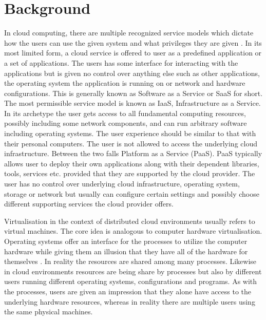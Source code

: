 \section{Background}

			In cloud computing, there are multiple recognized service models which dictate how the users can use the given system and what privileges they are given \cite{Mell:2011:SND:2206223}. In its most limited form, a cloud service is offered to user as a predefined application or a set of applications. The users has some interface for interacting with the applications but is given no control over anything else such as other applications, the operating system the application is running on or network and hardware configurations. This is generally known as Software as a Service or SaaS for short. The most permissible service model is known as IaaS, Infrastructure as a Service. In its archetype the user gets access to all fundamental computing resources, possibly including some network components, and can run arbitrary software including operating systems. The user experience should be similar to that with their personal computers. The user is not allowed to access the underlying cloud infrastructure. Between the two falls Platform as a Service (PaaS). PaaS typically allows user to deploy their own applications along with their dependent libraries, tools, services etc. provided that they are supported by the cloud provider. The user has no control over underlying cloud infrastructure, operating system, storage or network but usually can configure certain settings and possibly choose different supporting services the cloud provider offers.

Virtualisation in the context of distributed cloud environments usually refers to virtual machines. The core idea is analogous to computer hardware virtualisation. Operating systems offer an interface for the processes to utilize the computer hardware while giving them an illusion that they have all of the hardware for themselves \cite{ArpaciDusseau14-Book}. In reality the resources are shared among many processes. Likewise in cloud environments resources are being share by processes but also by different users running different operating systems, configurations and programs. As with the processes, users are given an impression that they alone have access to the underlying hardware resources, whereas in reality there are multiple users using the same physical machines.


